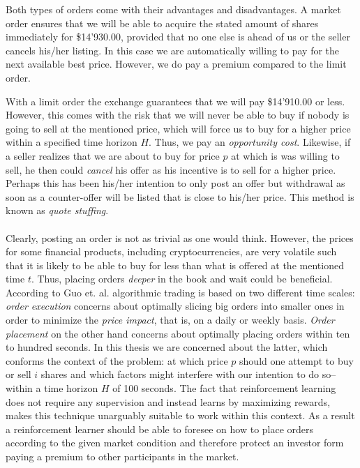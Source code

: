 Both types of orders come with their advantages and disadvantages.
A market order ensures that we will be able to acquire the stated amount of shares immediately for \$14'930.00, provided that no one else is ahead of us or the seller cancels his/her listing. 
In this case we are automatically willing to pay for the next available best price.
However, we do pay a premium compared to the limit order.

With a limit order the exchange guarantees that we will pay \$14'910.00 or less.
However, this comes with the risk that we will never be able to buy if nobody is going to sell at the mentioned price, which will force us to buy for a higher price within a specified time horizon $H$.
Thus, we pay an \textit{opportunity cost}.
Likewise, if a seller realizes that we are about to buy for price $p$ at which is was willing to sell, he then could \textit{cancel} his offer as his incentive is to sell for a higher price.
Perhaps this has been his/her intention to only post an offer but withdrawal as soon as a counter-offer will be listed that is close to his/her price.
This method is known as \textit{quote stuffing}.
\\
\\
Clearly, posting an order is not as trivial as one would think.
However, the prices for some financial products, including cryptocurrencies, are very volatile such that it is likely to be able to buy for less than what is offered at the mentioned time $t$.
Thus, placing orders \textit{deeper} in the book and wait could be beneficial.
According to Guo et. al. \cite{guo2013optimal} algorithmic trading is based on two different time scales: \textit{order execution} concerns about optimally slicing big orders into smaller ones in order to minimize the \textit{price impact}, that is, on a daily or weekly basis.
\textit{Order placement} on the other hand concerns about optimally placing orders within ten to hundred seconds. 
In this thesis we are concerned about the latter, which conforms the context of the problem: at which price $p$ should one attempt to buy or sell $i$ shares and which factors might interfere with our intention to do so--within a time horizon $H$ of 100 seconds.
The fact that reinforcement learning does not require any supervision and instead learns by maximizing rewards, makes this technique unarguably suitable to work within this context.
As a result a reinforcement learner should be able to foresee on how to place orders according to the given market condition and therefore protect an investor form paying a premium to other participants in the market.

